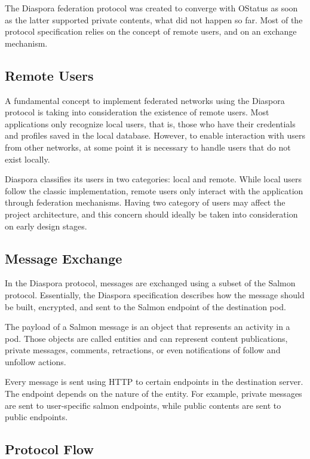The Diaspora federation protocol was created to converge with OStatus as
soon as the latter supported private contents, what did not happen so
far. Most of the protocol specification relies on the concept of remote
users, and on an exchange mechanism.

\subsection{Remote Users}

A fundamental concept to implement federated networks using the Diaspora
protocol is taking into consideration the existence of remote users.
Most applications only recognize local users, that is, those who have
their credentials and profiles saved in the local database. However, to
enable interaction with users from other networks, at some point it is
necessary to handle users that do not exist locally.

Diaspora classifies its users in two categories: local and remote. While
local users follow the classic implementation, remote users only
interact with the application through federation mechanisms. Having two
category of users may affect the project architecture, and this concern
should ideally be taken into consideration on early design stages.

\subsection{Message Exchange}

In the Diaspora protocol, messages are exchanged using a subset of the
Salmon protocol. Essentially, the Diaspora specification describes how
the message should be built, encrypted, and sent to the Salmon endpoint
of the destination pod.

The payload of a Salmon message is an object that represents an
activity in a pod. Those objects are called entities and can represent
content publications, private messages, comments, retractions, or even
notifications of follow and unfollow actions.

Every message is sent using HTTP to certain endpoints in the destination
server.  The endpoint depends on the nature of the entity. For example,
private messages are sent to user-specific salmon endpoints, while
public contents are sent to public endpoints.

\subsection{Protocol Flow}

